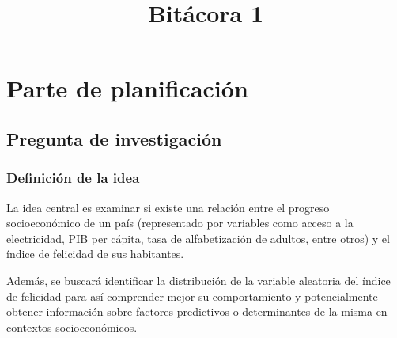 \documentclass[12pt,oneside,letterpaper,spanish]{article}
\title{Bitácora 1} %
\begin{document}


\newpage
\doublespacing
\renewcommand{\baselinestretch}{1}\normalsize
\tableofcontents
\renewcommand{\baselinestretch}{1}\normalsize
\thispagestyle{fancy} %

\newpage
{} 


%
%

\section{Parte de planificación} \label{ch1}

\subsection{Pregunta de investigación}

\subsubsection{Definición de la idea}

La idea central es examinar si existe una relación entre el progreso socioeconómico de un país (representado por variables como acceso a la electricidad, PIB per cápita, tasa de alfabetización de adultos, entre otros) y el índice de felicidad de sus habitantes. 

Además, se buscará identificar la distribución de la variable aleatoria del índice de felicidad para así comprender mejor su comportamiento y potencialmente obtener información sobre factores predictivos o determinantes de la misma en contextos socioeconómicos.  
\end{document}
